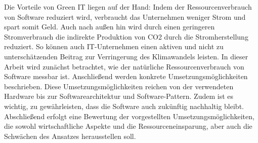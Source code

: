 \documentclass[utf8,biblatex]{lni}
\begin{document}
\newline \newline
Die Vorteile von Green IT liegen auf der Hand: Indem der Ressourcenverbrauch von Software reduziert wird, verbraucht das Unternehmen weniger Strom und spart somit Geld. Auch nach außen hin wird durch einen geringeren Stromverbrauch die indirekte Produktion von CO2 durch die Stromherstellung reduziert. So können auch IT-Unternehmen einen aktiven und nicht zu unterschätzenden Beitrag zur Verringerung des Klimawandels leisten.
\newline \newline
In dieser Arbeit wird zunächst betrachtet, wie der natürliche Ressourcenverbrauch von Software messbar ist. Anschließend werden konkrete Umsetzungsmöglichkeiten beschrieben. Diese Umsetzungsmöglichkeiten reichen von der verwendeten Hardware bis zur Softwarearchitektur und Software-Pattern. Zudem ist es wichtig, zu gewährleisten, dass die Software auch zukünftig nachhaltig bleibt. Abschließend erfolgt eine Bewertung der vorgestellten Umsetzungsmöglichkeiten, die sowohl wirtschaftliche Aspekte und die Ressourceneinsparung, aber auch die Schwächen des Ansatzes herausstellen soll.
\end{document}

